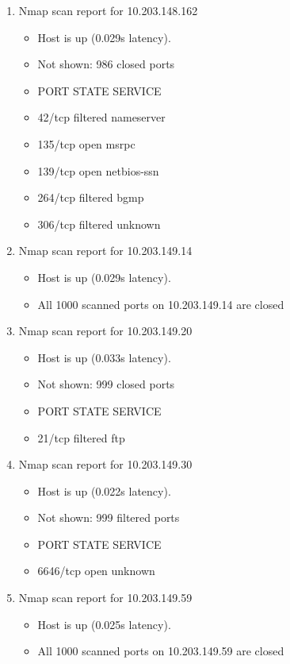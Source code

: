 \documentclass[12pt]{article}
\begin{document}
\begin{enumerate}
\item Nmap scan report for 10.203.148.162
\begin{itemize}\item 
Host is up (0.029s latency).\item 
Not shown: 986 closed ports\item 
PORT      STATE    SERVICE\item 
42/tcp    filtered nameserver\item 
135/tcp   open     msrpc\item 
139/tcp   open     netbios-ssn\item 
264/tcp   filtered bgmp\item 
306/tcp   filtered unknown
\end{itemize}

\item Nmap scan report for 10.203.149.14
\begin{itemize}\item 
Host is up (0.029s latency).\item 
All 1000 scanned ports on 10.203.149.14 are closed
\end{itemize}

\item Nmap scan report for 10.203.149.20
\begin{itemize}\item 
Host is up (0.033s latency).\item 
Not shown: 999 closed ports\item 
PORT   STATE    SERVICE\item 
21/tcp filtered ftp
\end{itemize}

\item Nmap scan report for 10.203.149.30
\begin{itemize}\item 
Host is up (0.022s latency).\item 
Not shown: 999 filtered ports\item 
PORT     STATE SERVICE\item 
6646/tcp open  unknown
\end{itemize}

\item Nmap scan report for 10.203.149.59
\begin{itemize}\item 
Host is up (0.025s latency).\item 
All 1000 scanned ports on 10.203.149.59 are closed
\end{itemize}


\end{enumerate}
\end{document}
